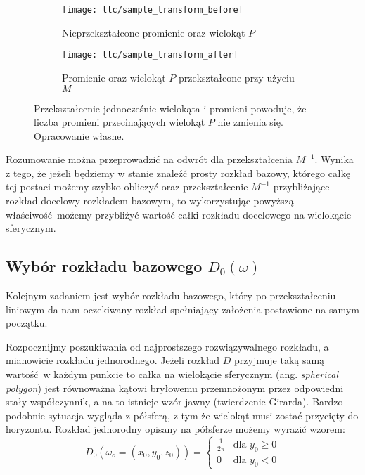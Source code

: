 \documentclass[../main.tex]{subfiles}
\begin{document}
\begin{figure}
    \centering
    \begin{subfigure}[t]{0.45\textwidth}
        \texttt{[image: ltc/sample\_transform\_before]}
        \label{fig:LTCTransformBefore}
        \caption{Nieprzekształcone promienie oraz wielokąt $P$}
    \end{subfigure}
    \hspace{0.05\textwidth}
    \begin{subfigure}[t]{0.45\textwidth}
        \centering
        \texttt{[image: ltc/sample\_transform\_after]}
        \label{fig:LTCTransformAfter}
        \caption{Promienie oraz wielokąt $P$ przekształcone przy użyciu $M$}
    \end{subfigure}
    
    \caption{Przekształcenie jednocześnie wielokąta i promieni powoduje, że liczba promieni przecinających wielokąt $P$ nie zmienia się. Opracowanie własne.}
    \label{fig:LTCTransformBeforeAfter}
\end{figure}

Rozumowanie można przeprowadzić na odwrót dla przekształcenia $M^{-1}$. Wynika z tego,
że jeżeli będziemy w stanie znaleźć prosty rozkład bazowy, którego całkę tej
postaci możemy szybko obliczyć oraz przekształcenie $M^{-1}$ przybliżające
rozkład docelowy rozkładem bazowym, to wykorzystując powyższą właściwość możemy
przybliżyć wartość całki rozkładu docelowego na wielokącie sferycznym.


\subsection{Wybór rozkładu bazowego $D_0(\omega)$}

Kolejnym zadaniem jest wybór rozkładu bazowego, który po przekształceniu
liniowym da nam oczekiwany rozkład spełniający założenia postawione na
samym początku.

Rozpocznijmy poszukiwania od najprostszego rozwiązywalnego rozkładu, a
mianowicie rozkładu jednorodnego. Jeżeli rozkład $D$ przyjmuje taką samą
wartość w każdym punkcie to całka na wielokącie sferycznym (ang.
\textit{spherical polygon}) jest równoważna kątowi bryłowemu przemnożonym 
przez odpowiedni stały współczynnik, a na to
istnieje wzór jawny \cite{Arvo,Snyder} (twierdzenie Girarda).
Bardzo podobnie sytuacja wygląda z półsferą, z tym że wielokąt musi zostać
przycięty do horyzontu. Rozkład jednorodny opisany na półsferze możemy wyrazić wzorem:
\[
D_0(\omega_o=(x_0, y_0, z_0)) = \begin{cases}
  \frac{1}{2\pi} & \text{dla } y_0 \geq 0 \\
  0 & \text{dla } y_0 < 0
\end{cases}
\]
\end{document}
